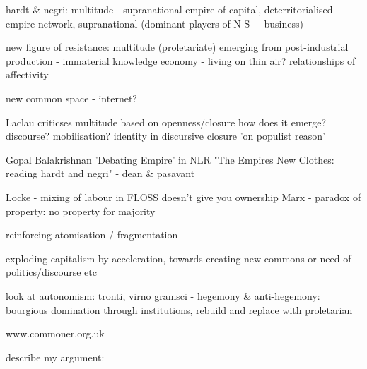 hardt & negri: multitude - supranational empire of capital, deterritorialised empire
		network, supranational (dominant players of N-S + business)
		
		new figure of resistance: multitude (proletariate)
			emerging from post-industrial production - immaterial
			knowledge economy - living on thin air?
		relationships of affectivity
		
		new common space - internet?
		
		Laclau criticses multitude based on openness/closure
			how does it emerge? discourse? mobilisation?
			identity in discursive closure
			'on populist reason'
			
		Gopal Balakrishnan 'Debating Empire' in NLR
		"The Empires New Clothes: reading hardt and negri" - dean & pasavant


Locke - mixing of labour in FLOSS doesn't give you ownership
Marx - paradox of property: no property for majority

reinforcing atomisation / fragmentation

exploding capitalism by acceleration, towards creating new commons
or
need of politics/discourse etc

look at autonomism: tronti, virno
gramsci - hegemony & anti-hegemony: bourgious domination through institutions, rebuild and replace with proletarian

www.commoner.org.uk

describe my argument:
